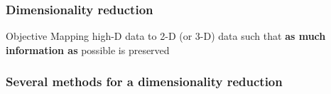 \begin{frame}
	\frametitle{Dimensionality reduction}
	
	\vspace{0.2cm}
	
	\begin{block}{Objective}
		Mapping high-D data to 2-D (or 3-D) data such that \textbf{as much information as} possible is preserved
	\end{block}
	
	\begin{center}
	\end{center}
\end{frame}

\begin{frame}
	\frametitle{Several methods for a dimensionality reduction}
	
	\vspace{0.4cm}
	
	\begin{center}
	\end{center}
\end{frame}
